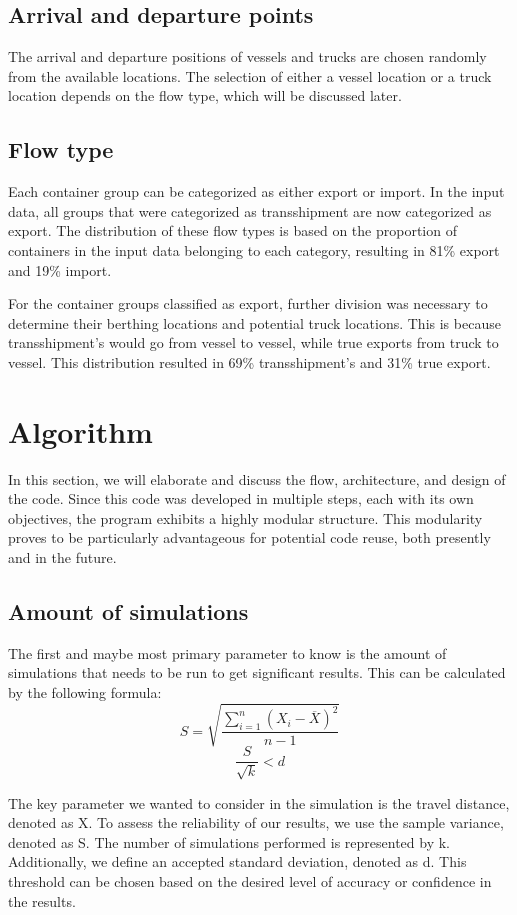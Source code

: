 \documentclass{article}
\begin{document}
\subsection{Arrival and departure points}
The arrival and departure positions of vessels and trucks are chosen randomly
from the available locations. The selection of either a vessel location or a
truck location depends on the flow type, which will be discussed later.

\subsection{Flow type}
Each container group can be categorized as either export or import. In the
input data, all groups that were categorized as transshipment are now
categorized as export. The distribution of these flow types is based on the
proportion of containers in the input data belonging to each category,
resulting in 81\% export and 19\% import.

For the container groups classified as export, further division was necessary
to determine their berthing locations and potential truck locations. This is
because transshipment's would go from vessel to vessel, while true exports from
truck to vessel. This distribution resulted in 69\% transshipment's and 31\%
true export.

\section{Algorithm}
In this section, we will elaborate and discuss the flow, architecture, and
design of the code. Since this code was developed in multiple steps, each with
its own objectives, the program exhibits a highly modular structure. This
modularity proves to be particularly advantageous for potential code reuse,
both presently and in the future.

\subsection{Amount of simulations}
The first and maybe most primary parameter to know is the amount of simulations
that needs to be run to get significant results. This can be calculated by the
following formula: \[S = \sqrt{\frac{\sum_{i = 1}^{n}(X_i-\overline{X})^2}{n
            -1}}\] \[\frac{S}{\sqrt{k}} < d\]

The key parameter we wanted to consider in the simulation is the travel
distance, denoted as X. To assess the reliability of our results, we use the
sample variance, denoted as S. The number of simulations performed is
represented by k. Additionally, we define an accepted standard deviation,
denoted as d. This threshold can be chosen based on the desired level of
accuracy or confidence in the results.
\end{document}
